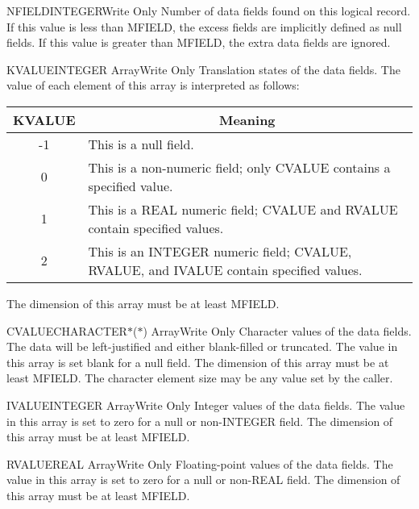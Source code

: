 \begin{argy}{NFIELD}{INTEGER}{Write Only}
Number of data fields found on this logical record.  If this value is less
than MFIELD, the excess fields are implicitly defined as null fields.  If
this value is greater than MFIELD, the extra data fields are ignored.
\end{argy}

\begin{argy}{KVALUE}{INTEGER Array}{Write Only}
Translation states of the data fields.  The value of
each element of this array is interpreted as follows:

\begin{tabular}{|cp{9 cm}|} \hline \hline
KVALUE & \multicolumn{1}{c|}{Meaning}\\ \hline
-1 & This is a null field.\\
0 & This is a non-numeric field; only CVALUE
contains a specified value.\\
1 & This is a REAL numeric field; CVALUE and
RVALUE contain specified values.\\
2 & This is an INTEGER numeric field; CVALUE,
RVALUE, and IVALUE contain specified values.\\ \hline \hline
\end{tabular}

The dimension of this array must be at least MFIELD.
\end{argy}

\begin{argy}{CVALUE}{CHARACTER$*$($*$) Array}{Write Only}
Character values of the data fields.  The data will be
left-justified and either blank-filled or truncated.
The value in this array is set blank for a null field.
The dimension of this array must be at least MFIELD.
The character element size may be any value set by the
caller.
\end{argy}

\begin{argy}{IVALUE}{INTEGER Array}{Write Only}
Integer values of the data fields.  The value in this
array is set to zero for a null or non-INTEGER field.
The dimension of this array must be at least MFIELD.
\end{argy}

\begin{argy}{RVALUE}{REAL Array}{Write Only}
Floating-point values of the data fields.  The value in
this array is set to zero for a null or non-REAL field.
The dimension of this array must be at least MFIELD.
\end{argy}

